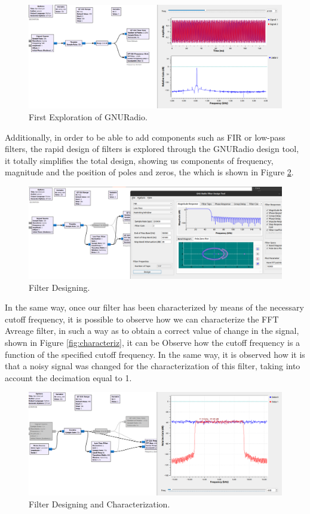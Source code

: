 \documentclass[12pt, twoside]{report}
\begin{document}
\begin{figure}[!h]
\centering
  \includegraphics[width=\linewidth]{images/Frequency_time.png}
  \caption{First Exploration of GNURadio.}
  \label{fig:timefreq1}
\end{figure}
Additionally, in order to be able to add components such as FIR or low-pass filters, the rapid design of filters is explored through the GNURadio design tool, it totally simplifies the total design, showing us components of frequency, magnitude and the position of poles and zeros, the which is shown in Figure \ref{fig:filterdes}.
\begin{figure}[!h]
\centering
  \includegraphics[width=\linewidth]{images/filter_design.png}
  \caption{Filter Designing.}
  \label{fig:filterdes}
\end{figure}
In the same way, once our filter has been characterized by means of the necessary cutoff frequency, it is possible to observe how we can characterize the FFT Avreage filter, in such a way as to obtain a correct value of change in the signal, shown in Figure \ref{fig:characteriz}, it can be Observe how the cutoff frequency is a function of the specified cutoff frequency. In the same way, it is observed how it is that a noisy signal was changed for the characterization of this filter, taking into account the decimation equal to 1.\\
\begin{figure}[!h]
\centering
  \includegraphics[width=\linewidth]{images/Frecuency_characterization.png}
  \caption{Filter Designing and Characterization.}
  \label{fig:characterization}
\end{figure}
\end{document}
